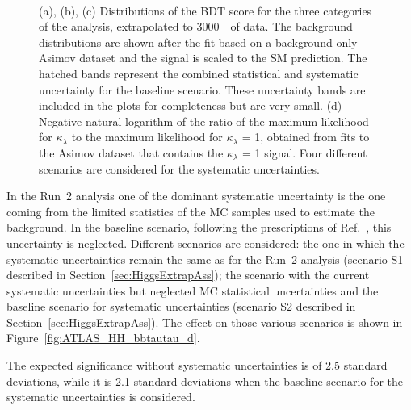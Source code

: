 \begin{figure}[!htb]
\centering 
{} 
\\
\caption{(a), (b), (c) Distributions of the BDT score for the three categories of the analysis, extrapolated to 3000~\fbinv\ of data. The background distributions are shown after the fit based on a background-only Asimov dataset and the signal is scaled to the SM prediction. The hatched bands represent the combined statistical and systematic uncertainty for the baseline scenario. These uncertainty bands are included in the plots for completeness but are very small. (d) Negative natural logarithm of the ratio of the maximum likelihood for $\kappa_{\lambda}$ to the maximum likelihood for $\kappa_{\lambda}$ = 1, obtained from fits to the Asimov dataset that contains the $\kappa_{\lambda}$ = 1 signal. Four different scenarios are considered for the systematic uncertainties.} 
\label{fig:ATLAS_HH_bbtautau} 
\end{figure}

In the Run~2 analysis one of the dominant systematic uncertainty is the one coming from the limited statistics of the MC samples used to estimate the background. In the baseline scenario, following the prescriptions of Ref.~\cite{ATLASperfPUBnote}, this uncertainty is neglected.
Different scenarios are considered: the one in which the systematic uncertainties remain the same as for the Run~2 analysis (scenario S1 described in Section~\ref{sec:HiggsExtrapAss}); the scenario with the current systematic uncertainties but neglected MC statistical uncertainties and the baseline scenario for systematic uncertainties (scenario S2 described in Section~\ref{sec:HiggsExtrapAss}). The effect on those various scenarios is shown in Figure~\ref{fig:ATLAS_HH_bbtautau_d}.

The expected significance without systematic uncertainties is of 2.5 standard deviations, while it is 2.1 standard deviations when the baseline scenario for the systematic uncertainties is considered.

